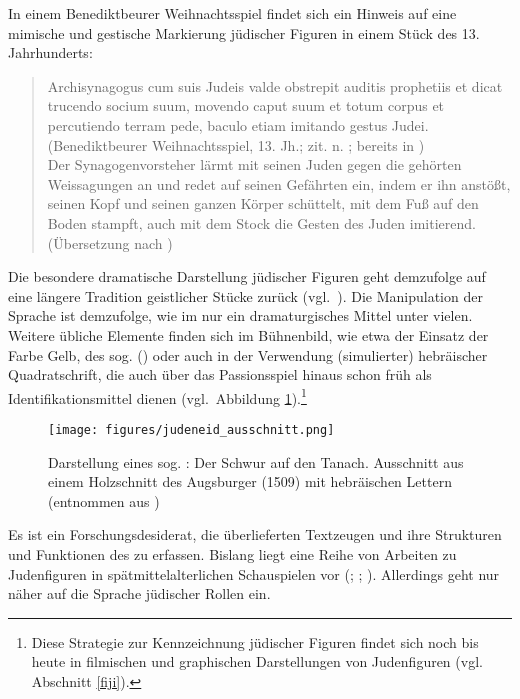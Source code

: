 In einem Benediktbeurer Weihnachtsspiel findet sich ein Hinweis auf eine mimische und gestische Markierung jüdischer Figuren in einem Stück des 13. Jahrhunderts:

\begin{quote}
Archisynagogus cum suis Judeis valde obstrepit auditis prophetiis et dicat trucendo socium suum, movendo caput suum et totum corpus et percutiendo terram pede, baculo etiam imitando gestus Judei. (Benediktbeurer Weihnachtsspiel, 13. Jh.; zit. n. \citealt[260f]{Stumpfl1936}; bereits in \citealt[175]{Young1933}) \\

\footnotesize{Der Synagogenvorsteher lärmt mit seinen Juden gegen die gehörten
Weissagungen an und redet auf seinen Gefährten ein, indem er ihn
anstößt, seinen Kopf und seinen ganzen Körper schüttelt, mit dem Fuß auf
den Boden stampft, auch mit dem Stock die Gesten des Juden imitierend. (Übersetzung nach \citealt[473 Fn.,\,213]{Freise2002})}


\end{quote}

Die besondere dramatische Darstellung jüdischer Figuren geht demzufolge auf eine längere Tradition geistlicher Stücke zurück (vgl.\, \citealt[437]{Freise2002}). Die Manipulation der Sprache ist demzufolge, wie im \hai{{\LiJi}} nur ein dramaturgisches Mittel unter vielen. Weitere übliche Elemente finden sich im Bühnenbild, wie etwa der Einsatz der Farbe Gelb, des sog.  (\citealt[55–57]{Frey1992}) oder auch in der Verwendung (simulierter) hebräischer Quadratschrift, die auch über das Passionsspiel hinaus schon früh als Identifikationsmittel dienen (vgl.\, Abbildung \ref{judeneid}).\footnote{Diese Strategie zur Kennzeichnung jüdischer Figuren findet sich noch bis heute in filmischen und graphischen Darstellungen von Judenfiguren (vgl.\, Abschnitt \ref{fiji}).}\,%
 

\begin{figure}[h!]
\centering
\texttt{[image: figures/judeneid\_ausschnitt.png]}
		\caption{\label{judeneid} Darstellung eines sog. : Der Schwur auf den Tanach. Ausschnitt aus einem Holzschnitt des Augsburger  (1509) mit hebräischen Lettern (entnommen aus \citealt[851]{Wolf2003})} 
		\end{figure}



Es ist ein Forschungsdesiderat, die überlieferten Textzeugen und ihre Strukturen und Funktionen des \hai{{\LiHe}} zu erfassen. Bislang liegt eine Reihe von Arbeiten zu Judenfiguren in spätmittelalterlichen Schauspielen vor (\citealt{Carrington1897}; \citealt[28--29]{Lowack1905}; \citealt{Bremer1986,Frenzel1942,Frey1991,Frey1992,Frey1994,Wenzel1992,Rommel2002,Freise2002,Mikosch2010}). Allerdings geht nur \citet{Frey1992,Frey1994} näher auf die Sprache jüdischer Rollen ein.

